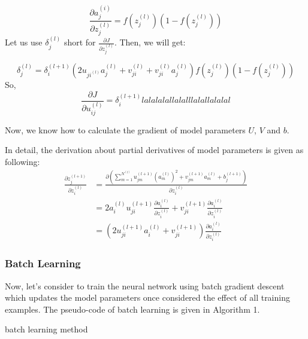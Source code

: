 \begin{equation}
\frac{\partial{a_j^{(i)}}}{\partial{z_j^{(l)}}}=
f(z_j^{(l)})(1-f(z_j^{(l)}))
\end{equation}
Let us use $\delta_j^{(l)}$ short for $\frac{\partial{J}}{\partial{z_j^{(l)}}}$.
Then, we will get:

\begin{equation}
\delta_j^{(l)} = \delta_i^{(l+1)}
(2u_{ji^{(l)}}a_j^{(l)}+v_{ji}^{(l)} + v_{ji}^{(l)}a_j^{(l)})
f(z_j^{(l)})(1-f(z_j^{(l)}))
\end{equation}
So,
\begin{equation}
\frac{\partial{J}}{\partial{u_{ij}^{(l)}}}=
\delta_i^{(l+1)}lalalalallalalllalallalalal
\end{equation}

Now, we know how to calculate the gradient of model parameters $U$, $V$ and $b$.

In detail, the derivation about partial derivatives of model parameters is given as following:
\begin{equation}\label{(1-1)}
\begin{split}
\frac{\partial{z_j^{(l+1)}}}{\partial{z_i^{(l)}}} & =
\frac{\partial{(\sum_{m=1}^{N^(l)}u_{jm}^{(l+1)}(a_{m}^{(l)})^2+v_{jm}^{(l+1)}a_m^{(l)}+b_j^{(l+1)})}}
{\partial{z_i^{(l)}}}\\
& = 2a_i^{(l)}u_{ji}^{(l+1)}\frac{\partial{a_i^{(l)}}}{\partial{z_i^{(l)}}}+
v_{ji}^{(l+1)}\frac{\partial{a_i^{(l)}}}{\partial{z_i^{(l)}}}\\
& = (2u_{ji}^{(l+1)}a_i^{(l)}+v_{ji}^{(l+1)})\frac{\partial{a_i^{(l)}}}{\partial{z_i^{(l)}}}
\end{split}
\end{equation}

\subsubsection{Batch Learning}
Now, let's consider to train the neural network using batch gradient descent which updates the model parameters once considered the effect of all training examples. The pseudo-code of batch learning is given in Algorithm 1.
\begin{algorithm}
\caption{batch learning method}
\begin{algorithmic}
\REPEAT
{}
\end{algorithmic}
\end{algorithm}

